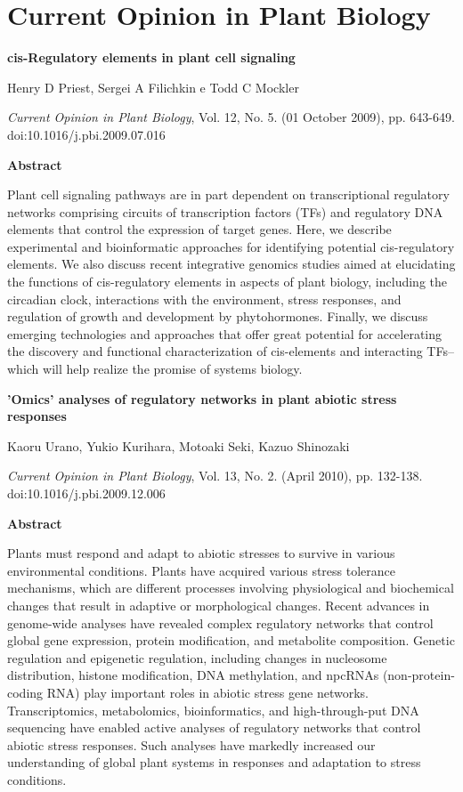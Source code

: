 \chapter{Current Opinion in Plant Biology}


{\Large \bf cis-Regulatory elements in plant cell signaling}

Henry D Priest, Sergei A Filichkin e Todd C Mockler

{\it Current Opinion in Plant Biology}, Vol. 12, No. 5. (01 October 2009), pp. 643-649. doi:10.1016/j.pbi.2009.07.016

{\large \bf Abstract}

Plant cell signaling pathways are in part dependent on transcriptional regulatory networks comprising circuits of transcription factors (TFs) and regulatory DNA elements that control the expression of target genes. Here, we describe experimental and bioinformatic approaches for identifying potential cis-regulatory elements. We also discuss recent integrative genomics studies aimed at elucidating the functions of cis-regulatory elements in aspects of plant biology, including the circadian clock, interactions with the environment, stress responses, and regulation of growth and development by phytohormones. Finally, we discuss emerging technologies and approaches that offer great potential for accelerating the discovery and functional characterization of cis-elements and interacting TFs--which will help realize the promise of systems biology.



{\Large \bf 'Omics' analyses of regulatory networks in plant abiotic stress responses}

Kaoru Urano, Yukio Kurihara, Motoaki Seki, Kazuo Shinozaki

{\it Current Opinion in Plant Biology}, Vol. 13, No. 2. (April 2010), pp. 132-138. doi:10.1016/j.pbi.2009.12.006

{\large \bf Abstract}

Plants must respond and adapt to abiotic stresses to survive in various environmental conditions. Plants have acquired various stress tolerance mechanisms, which are different processes involving physiological and biochemical changes that result in adaptive or morphological changes. Recent advances in genome-wide analyses have revealed complex regulatory networks that control global gene expression, protein modification, and metabolite composition. Genetic regulation and epigenetic regulation, including changes in nucleosome distribution, histone modification, DNA methylation, and npcRNAs (non-protein-coding RNA) play important roles in abiotic stress gene networks. Transcriptomics, metabolomics, bioinformatics, and high-through-put DNA sequencing have enabled active analyses of regulatory networks that control abiotic stress responses. Such analyses have markedly increased our understanding of global plant systems in responses and adaptation to stress conditions.